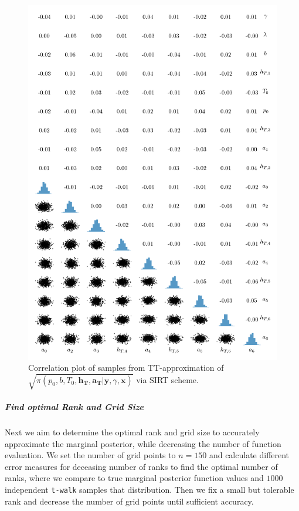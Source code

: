 \begin{figure}%
	\includegraphics[]{2ndCorrPlot.png}
	\caption*{Correlation plot of samples from TT-approximation of $\sqrt{\pi(p_0,b,T_0,\bm{h_T},\bm{a_T} | \bm{y}, \gamma, \bm{x})}$ via SIRT scheme.}
\end{figure}
\cleardoublepage


\subparagraph{Find optimal Rank and Grid Size}
Next we aim to determine the optimal rank and grid size to accurately approximate the marginal posterior, while decreasing the number of function evaluation.
We set the number of grid points to $n = 150$ and calculate different error measures for deceasing number of ranks to find the optimal number of ranks, where we compare to true marginal posterior function values and $1000$ independent \texttt{t-walk} samples that distribution.
Then we fix a small but tolerable rank and decrease the number of grid points until sufficient accuracy.

